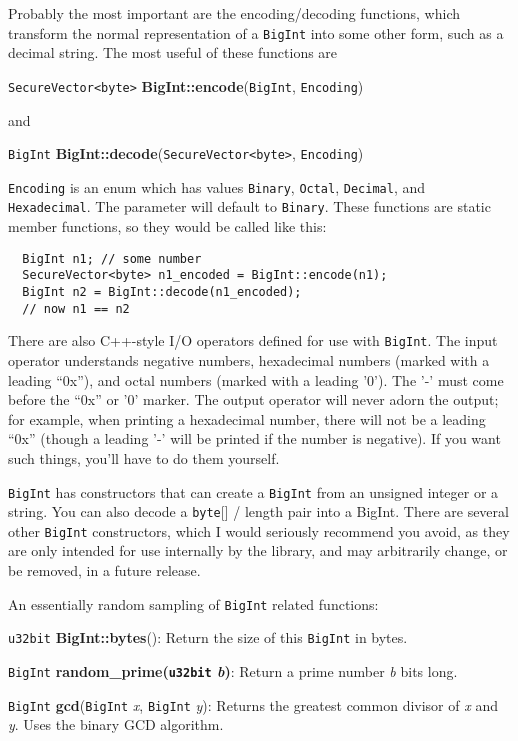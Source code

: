 \documentclass{article}
\newcommand{\function}[1]{\textbf{#1}}
\newcommand{\type}[1]{\texttt{#1}}
\renewcommand{\arg}[1]{\textsl{#1}}
\begin{document}
Probably the most important are the encoding/decoding functions, which
transform the normal representation of a \type{BigInt} into some other form,
such as a decimal string. The most useful of these functions are

\type{SecureVector<byte>} \function{BigInt::encode}(\type{BigInt},
\type{Encoding})

\noindent
and

\type{BigInt} \function{BigInt::decode}(\type{SecureVector<byte>},
\type{Encoding})

\type{Encoding} is an enum which has values \type{Binary}, \type{Octal},
\type{Decimal}, and \type{Hexadecimal}. The parameter will default to
\type{Binary}. These functions are static member functions, so they would be
called like this:

\begin{verbatim}
  BigInt n1; // some number
  SecureVector<byte> n1_encoded = BigInt::encode(n1);
  BigInt n2 = BigInt::decode(n1_encoded);
  // now n1 == n2
\end{verbatim}

There are also C++-style I/O operators defined for use with \type{BigInt}. The
input operator understands negative numbers, hexadecimal numbers (marked with a
leading ``0x''), and octal numbers (marked with a leading '0'). The '-' must
come before the ``0x'' or '0' marker. The output operator will never adorn the
output; for example, when printing a hexadecimal number, there will not be a
leading ``0x'' (though a leading '-' will be printed if the number is
negative). If you want such things, you'll have to do them yourself.

\type{BigInt} has constructors that can create a \type{BigInt} from an unsigned
integer or a string. You can also decode a \type{byte}[] / length pair into a
BigInt. There are several other \type{BigInt} constructors, which I would
seriously recommend you avoid, as they are only intended for use internally by
the library, and may arbitrarily change, or be removed, in a future release.

An essentially random sampling of \type{BigInt} related functions:

\type{u32bit} \function{BigInt::bytes}(): Return the size of this \type{BigInt}
in bytes.

\type{BigInt} \function{random\_prime(\type{u32bit} \arg{b})}: Return a prime
number \arg{b} bits long.

\type{BigInt} \function{gcd}(\type{BigInt} \arg{x}, \type{BigInt} \arg{y}):
Returns the greatest common divisor of \arg{x} and \arg{y}. Uses the binary
GCD algorithm.
\end{document}
